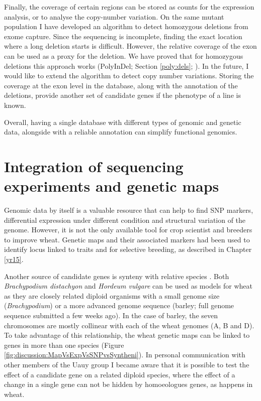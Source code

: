 Finally, the coverage of certain regions can be stored as counts for the expression analysis, or to analyse the copy-number variation. 
On the same mutant population I have developed an algorithm to detect homozygous deletions from exome capture. 
Since the sequencing is incomplete, finding the exact location where a long deletion starts is difficult. 
However, the relative coverage of the exon can be used as a proxy for the deletion. 
We have proved that for homozygous deletions this approach works (PolyInDel; Section \ref{poly:dels}; \citealt{Krasileva2016}). 
In the future, I would like to extend the algorithm to detect copy number variations. 
Storing the coverage at the exon level in the database, along with the annotation of the deletions, provide another set of candidate genes if the phenotype of a line is known. 

Overall, having a single database with different types of genomic and genetic data, alongside with a reliable annotation can simplify functional genomics. 

\pagebreak
\section{Integration of sequencing experiments and genetic maps}
Genomic data by itself is a valuable resource that can help to find SNP markers, differential expression under different condition and structural variation of the genome. 
However, it is not the only available tool for crop scientist and breeders to improve wheat. 
Genetic maps and their associated markers had been used to identify locus linked to traits and for selective breeding, as described in Chapter \ref{yr15}. 

Another source of candidate genes is synteny with relative species \citep{Moore1995}.  
Both \textit{Brachypodium distachyon} and \textit{Hordeum vulgare} can be used as models for wheat as they are closely related diploid organisms with a small genome size (\textit{Brachypodium}) or a more advanced genome sequence (barley; full genome sequence submitted a few weeks ago). 
In the case of barley, the seven chromosomes are mostly collinear \citep{Rustenholz2010} with each of the wheat genomes (A, B and D). 
To take advantage of this relationship, the wheat genetic maps can be linked to genes in more than one species (Figure \ref{fig:discussion:MapVsExpVsSNPvsSyntheni}).
In personal communication with other members of the Uauy group I became aware that it is possible to test the effect of a candidate gene on a related diploid species, where the effect of a change in a single gene can not be hidden by homoeologues genes, as happens in wheat. 

